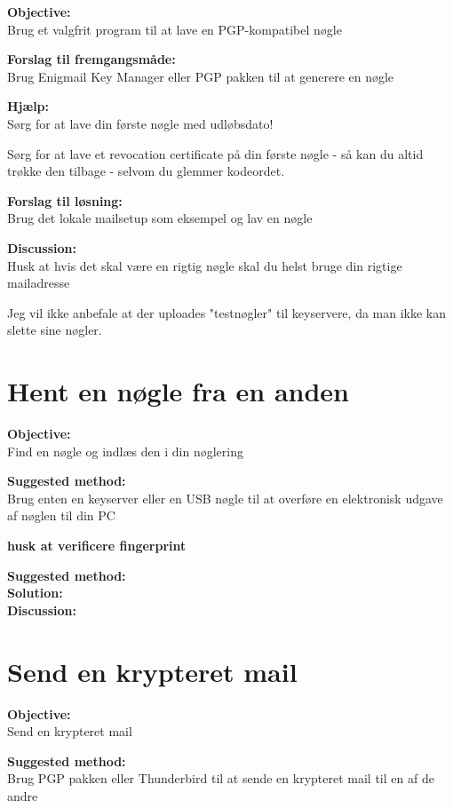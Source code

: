 \documentclass[a4paper,11pt,notitlepage]{report}
\begin{document}
{\bf Objective:}\\
Brug et valgfrit program til at lave en PGP-kompatibel nøgle

{\bfseries Forslag til fremgangsmåde:}\\
Brug Enigmail Key Manager eller PGP pakken til at generere en nøgle

{\bfseries Hjælp:}\\
Sørg for at lave din første nøgle med udløbsdato!

Sørg for at lave et revocation certificate på din første nøgle - så
kan du altid trøkke den tilbage - selvom du glemmer kodeordet.


{\bfseries Forslag til løsning:}\\
Brug det lokale mailsetup som eksempel og lav en nøgle


{\bf Discussion:}\\
Husk at hvis det skal være en rigtig nøgle skal du helst bruge din
rigtige mailadresse

Jeg vil ikke anbefale at der uploades "testnøgler" til keyservere, da
man ikke kan slette sine nøgler.


\chapter{Hent en nøgle fra en anden}
\label{ex:get-pgp-key}

{\bf Objective:}\\
Find en nøgle og indlæs den i din nøglering

{\bf Suggested method:}\\
Brug enten en keyserver  eller en USB nøgle
til at overføre en elektronisk udgave af nøglen til din PC

{\bf husk at verificere fingerprint}

{\bf Suggested method:}\\

{\bf Solution:}\\

{\bf Discussion:}\\


\chapter{Send en krypteret mail}
\label{ex:email-pgp-send}

{\bf Objective:}\\
Send en krypteret mail

{\bf Suggested method:}\\
Brug PGP pakken eller Thunderbird til at sende en krypteret mail til
en af de andre
\end{document}
